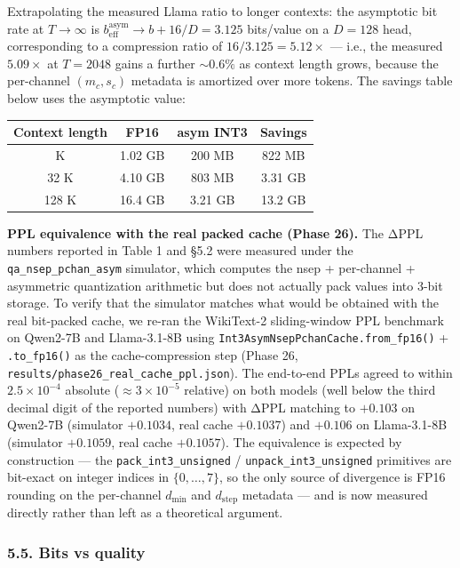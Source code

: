 Extrapolating the measured Llama ratio to longer contexts: the
asymptotic bit rate at \(T \to \infty\) is
\(b_\text{eff}^\text{asym} \to b + 16/D = 3.125\) bits/value on a
\(D = 128\) head, corresponding to a compression ratio of
\(16 / 3.125 = 5.12\times\) --- i.e., the measured \(5.09\times\) at
\(T = 2048\) gains a further \(\sim 0.6 \%\) as context length grows,
because the per-channel \((m_c, s_c)\) metadata is amortized over more
tokens. The savings table below uses the asymptotic value:

{\def\LTcaptype{none} %
\begin{longtable}[]{@{}cccc@{}}
\toprule\noalign{}
Context length & FP16 & asym INT3 & Savings \\
\midrule\noalign{}
\endhead
\bottomrule\noalign{}
\endlastfoot
8 K & 1.02 GB & 200 MB & 822 MB \\
32 K & 4.10 GB & 803 MB & 3.31 GB \\
128 K & 16.4 GB & 3.21 GB & 13.2 GB \\
\end{longtable}
}

\textbf{PPL equivalence with the real packed cache (Phase 26).} The ΔPPL
numbers reported in Table 1 and §5.2 were measured under the
\texttt{qa\_nsep\_pchan\_asym} simulator, which computes the nsep +
per-channel + asymmetric quantization arithmetic but does not actually
pack values into 3-bit storage. To verify that the simulator matches
what would be obtained with the real bit-packed cache, we re-ran the
WikiText-2 sliding-window PPL benchmark on Qwen2-7B and Llama-3.1-8B
using \texttt{Int3AsymNsepPchanCache.from\_fp16()} +
\texttt{.to\_fp16()} as the cache-compression step (Phase 26,
\texttt{results/phase26\_real\_cache\_ppl.json}). The end-to-end PPLs
agreed to within \(2.5 \times 10^{-4}\) absolute
(\(\approx 3 \times 10^{-5}\) relative) on both models (well below the
third decimal digit of the reported numbers) with ΔPPL matching to
\(+0.103\) on Qwen2-7B (simulator \(+0.1034\), real cache \(+0.1037\))
and \(+0.106\) on Llama-3.1-8B (simulator \(+0.1059\), real cache
\(+0.1057\)). The equivalence is expected by construction --- the
\texttt{pack\_int3\_unsigned} / \texttt{unpack\_int3\_unsigned}
primitives are bit-exact on integer indices in \(\{0, \dots, 7\}\), so
the only source of divergence is FP16 rounding on the per-channel
\(d_{\min}\) and \(d_{\mathrm{step}}\) metadata --- and is now measured
directly rather than left as a theoretical argument.

\subsubsection{5.5. Bits vs quality}\label{bits-vs-quality}

